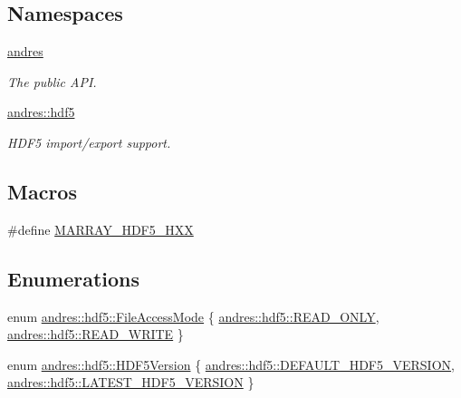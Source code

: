 \subsection*{Namespaces}
\begin{DoxyCompactItemize}
\item 
 \hyperlink{namespaceandres}{andres}
\begin{DoxyCompactList}\small\item\em The public A\+P\+I. \end{DoxyCompactList}\item 
 \hyperlink{namespaceandres_1_1hdf5}{andres\+::hdf5}
\begin{DoxyCompactList}\small\item\em H\+D\+F5 import/export support. \end{DoxyCompactList}\end{DoxyCompactItemize}
\subsection*{Macros}
\begin{DoxyCompactItemize}
\item 
\#define \hyperlink{marray-hdf5_8hxx_aabd36af6695d6700abdc06a2b435b735}{M\+A\+R\+R\+A\+Y\+\_\+\+H\+D\+F5\+\_\+\+H\+X\+X}
\end{DoxyCompactItemize}
\subsection*{Enumerations}
\begin{DoxyCompactItemize}
\item 
enum \hyperlink{namespaceandres_1_1hdf5_a08660935c7de0e1e76e007fc972933b9}{andres\+::hdf5\+::\+File\+Access\+Mode} \{ \hyperlink{namespaceandres_1_1hdf5_a08660935c7de0e1e76e007fc972933b9af05cb745b770e55c64efe88162f7e9fb}{andres\+::hdf5\+::\+R\+E\+A\+D\+\_\+\+O\+N\+L\+Y}, 
\hyperlink{namespaceandres_1_1hdf5_a08660935c7de0e1e76e007fc972933b9af215ccdde9335c237c14b7c1d35766d4}{andres\+::hdf5\+::\+R\+E\+A\+D\+\_\+\+W\+R\+I\+T\+E}
 \}
\item 
enum \hyperlink{namespaceandres_1_1hdf5_ad5194a7b8773d3776e8dfc068f58f41b}{andres\+::hdf5\+::\+H\+D\+F5\+Version} \{ \hyperlink{namespaceandres_1_1hdf5_ad5194a7b8773d3776e8dfc068f58f41baf4fdc18c306e5d07105ad62a1cf6fa93}{andres\+::hdf5\+::\+D\+E\+F\+A\+U\+L\+T\+\_\+\+H\+D\+F5\+\_\+\+V\+E\+R\+S\+I\+O\+N}, 
\hyperlink{namespaceandres_1_1hdf5_ad5194a7b8773d3776e8dfc068f58f41ba29da3f0202bdf4ea2b036678ae7aa717}{andres\+::hdf5\+::\+L\+A\+T\+E\+S\+T\+\_\+\+H\+D\+F5\+\_\+\+V\+E\+R\+S\+I\+O\+N}
 \}
\end{DoxyCompactItemize}
